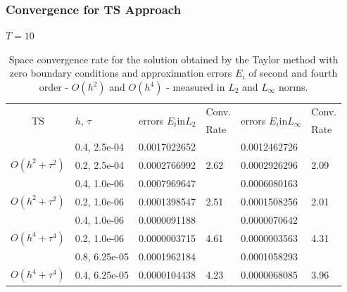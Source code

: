\documentclass{beamer}
\begin{document}
\begin{frame}
\frametitle{Convergence for TS Approach}
$T = 10$
\begin{table}[ht]
\centering
\small
		\begin{tabular}{||c|l|ll|ll||}
			\hline
			\hline
      \multirow{2  }{*}{TS}        & \multirow{2  }{*}{$h$, $\tau$}  & \multirow{2  }{*}{errors $E_i$in$L_2$}  &Conv.& \multirow{2  }{*}{errors $E_i$in$L_\infty$}  &Conv.  \\
	         &                    &                               & Rate   &                                        & Rate \\
   			\hline 
					\hline 
                                    &0.4, 2.5e-04          &0.0017022652 &            &0.0012462726    &      \\
      $O(h^2 + \tau^ 2)$ &0.2, 2.5e-04          &0.0002766992 & 2.62    &0.0002926296    &  2.09       \\
			\hline 
                                   &0.4, 1.0e-06        &0.0007969647 &            &0.0006080163    &      \\
      $O(h^2 + \tau^ 2)$ &0.2, 1.0e-06          &0.0001398547 & 2.51   &0.0001508256    &  2.01       \\
			\hline 
                                  &0.4, 1.0e-06        &  0.0000091188  &            &0.0000070642 &   \\
   $O(h^4+ \tau^4)$   &0.2, 1.0e-06          &0.0000003715   &4.61  &0.0000003563  & 4.31 \\
			\hline
                                 &0.8, 6.25e-05    & 0.0001962184   &        &  0.0001058293   &   \\
 $O(h^4+ \tau^4)$    &0.4, 6.25e-05     &0.0000104438 & 4.23  & 0.0000068085  & 3.96  \\
    \hline
			\hline 
		\end{tabular}
		\caption{Space convergence rate for the solution obtained by the Taylor method with zero boundary conditions and approximation errors $E_i$ of second and fourth order - $O(h^{2})$ and $O(h^{4})$ - measured in $L_2$ and $L_\infty$ norms.}
\label{tableA}
\end{table}

\end{frame}

\end{document}
